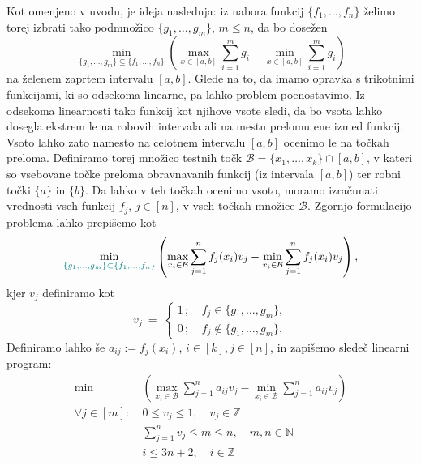 \documentclass[11pt]{article}
\theoremstyle{definition}
\newcommand{\N}{\mathbb{N}}
\newcommand{\Z}{\mathbb{Z}}
\newcommand{\1}{\mathbbm{1}}
\newcommand{\set}[1]{\{#1\}}
\newcommand{\green}[1]{\color{teal}#1\color{black}}
\newcommand{\B}{\mathcal{B}}
\begin{document}
Kot omenjeno v uvodu, je ideja naslednja: iz nabora funkcij $\set{f_1,\ldots,f_n}$ želimo torej izbrati tako podmnožico $\set{g_1,\ldots,g_m}$, $m \leq n$, da bo dosežen
$$\min_{\set{g_1,\ldots,g_m} \subseteq \set{f_1,\ldots,f_n}}\left({\max_{x \in [a,b]}\sum_{i=1}^m g_i - \min_{x \in [a,b]}\sum_{i=1}^m g_i}\right)$$
na želenem zaprtem intervalu $[a,b]$. Glede na to, da imamo opravka s trikotnimi funkcijami, ki so odsekoma linearne, pa lahko problem poenostavimo. Iz odsekoma linearnosti tako funkcij kot njihove vsote sledi, da bo vsota lahko dosegla ekstrem le na robovih intervala ali na mestu prelomu ene izmed funkcij. Vsoto lahko zato namesto na celotnem intervalu $[a,b]$ ocenimo le na točkah preloma. Definiramo torej množico testnih točk $\mathcal{B} = \set{x_1,\ldots,x_k} \cap [a,b]$, v kateri so vsebovane točke preloma obravnavanih funkcij (iz intervala $[a,b]$) ter robni točki $\set{a}$ in $\set{b}$. Da lahko v teh točkah ocenimo vsoto, moramo izračunati vrednosti vseh funkcij $f_j$, $j \in [n]$, v vseh točkah množice $\B$. Zgornjo formulacijo problema lahko prepišemo kot
$$\min_{\green{\set{g_1,\ldots,g_m} \subset \set{f_1,\ldots,f_n}}} \left( \max_{x_i \in \B} \sum_{j=1}^n f_j(x_i)v_j - \min_{x_i \in \mathcal{B}} \sum_{j=1}^n f_j(x_i)v_j \right),$$
kjer $v_j$ definiramo kot
$$v_j ~=~ \begin{cases}
1\,; ~&f_j \in \set{g_1,\ldots,g_m}, \\
0\,; ~&f_j \notin \set{g_1,\ldots,g_m}.
\end{cases}$$
Definiramo lahko še $a_{ij} := f_j(x_i)$, $i \in [k], j \in [n]$, in zapišemo sledeč linearni program:
\begin{align*}
\min &\left( \max_{x_i \in \B} \sum_{j=1}^n a_{ij}v_j - \min_{x_i \in \B} \sum_{j=1}^n a_{ij}v_j \right) \\
\forall j \in [m]: ~&0 \leq v_j \leq 1, \quad v_j \in \Z \\
&\sum_{j=1}^n v_j \leq m \leq n, \quad m,n \in \N \\
&i \leq 3n+2, \quad i \in \Z
\end{align*}

\end{document}
